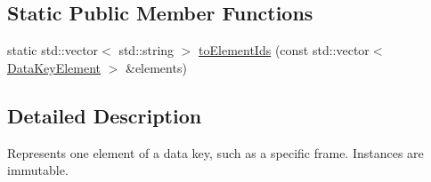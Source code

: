 \subsection*{Static Public Member Functions}
\begin{DoxyCompactItemize}
\item 
static std::vector$<$ std::string $>$ \hyperlink{classBUSBOY_1_1DataKeyElement_a5a00e57f4572dfe83c98aca908a3106b}{toElementIds} (const std::vector$<$ \hyperlink{classBUSBOY_1_1DataKeyElement}{DataKeyElement} $>$ \&elements)
\end{DoxyCompactItemize}


\subsection{Detailed Description}
Represents one element of a data key, such as a specific frame. Instances are immutable. 

